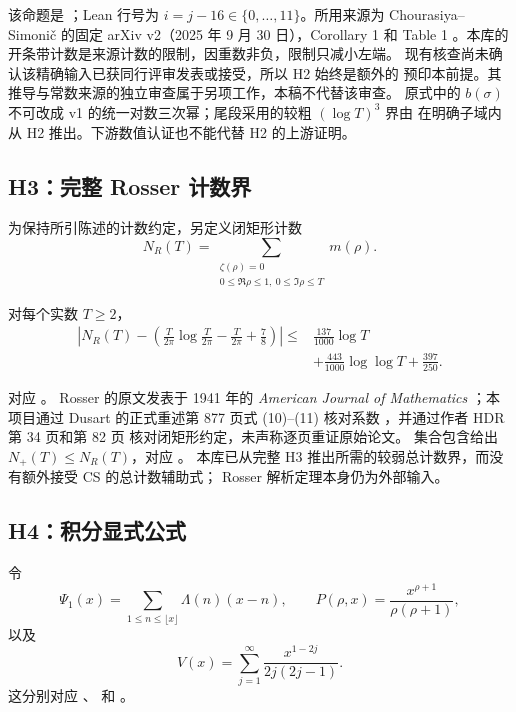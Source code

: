 该命题是 ；Lean 行号为
$i=j-16\in\{0,\ldots,11\}$。所用来源为 Chourasiya--Simoni\v{c}
的固定 arXiv v2（2025 年 9 月 30 日），Corollary 1 和 Table 1
\cite{CSv2}。本库的开条带计数是来源计数的限制，因重数非负，限制只减小左端。
现有核查尚未确认该精确输入已获同行评审发表或接受，所以 H2 始终是额外的
预印本前提。其推导与常数来源的独立审查属于另项工作，本稿不代替该审查。
原式中的 $b(\sigma)$ 不可改成 v1 的统一对数三次幂；尾段采用的较粗
$(\log T)^3$ 界由 
在明确子域内从 H2 推出。下游数值认证也不能代替 H2 的上游证明。

\subsection{H3：完整 Rosser 计数界}

为保持所引陈述的计数约定，另定义闭矩形计数
\[
N_R(T)=\sum_{\substack{\zeta(\rho)=0\\0\le\Re\rho\le1,\ 0\le\Im\rho\le T}}m(\rho).
\]
\begin{definition}
\label{hyp:rosser}
对每个实数 $T\ge2$，
\begin{equation}
\label{eq:rosser-input}
\begin{split}
\left|N_R(T)-\left(\frac{T}{2\pi}\log\frac{T}{2\pi}
-\frac{T}{2\pi}+\frac78\right)\right|
\le{}&\frac{137}{1000}\log T\\
&+\frac{443}{1000}\log\log T+\frac{397}{250}.
\end{split}
\end{equation}
\end{definition}
对应 。
Rosser 的原文发表于 1941 年的 \emph{American Journal of Mathematics}
\cite{Rosser1941}；本项目通过 Dusart 的正式重述第 877 页式 (10)--(11)
核对系数 \cite{Dusart2016}，并通过作者 HDR 第 34 页和第 82 页
核对闭矩形约定，未声称逐页重证原始论文。
集合包含给出 $N_+(T)\le N_R(T)$，对应
。
本库已从完整 H3 推出所需的较弱总计数界，而没有额外接受 CS 的总计数辅助式；
Rosser 解析定理本身仍为外部输入。

\subsection{H4：积分显式公式}

令
\[
\Psi_1(x)=\sum_{1\le n\le\lfloor x\rfloor}\Lambda(n)(x-n),\qquad
P(\rho,x)=\frac{x^{\rho+1}}{\rho(\rho+1)},
\]
以及
\[
V(x)=\sum_{j=1}^{\infty}\frac{x^{1-2j}}{2j(2j-1)}.
\]
这分别对应 、
 和
。

